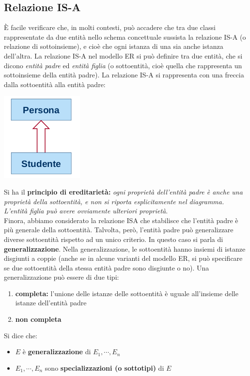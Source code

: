 \documentclass[a4paper,12pt, oneside]{book}
\begin{document}
\subsection{Relazione IS-A}
È facile verificare che, in molti contesti, può
accadere che tra due classi rappresentate da due
entità nello schema concettuale sussista la relazione
IS-A (o relazione di sottoinsieme), e cioè che ogni
istanza di una sia anche istanza dell'altra. La relazione IS-A nel modello ER si può definire tra
due entità, che si dicono \textit{entità padre} ed \textit{entità figlia} (o sottoentità, cioè quella che rappresenta un sottoinsieme della entità padre). La relazione IS-A si rappresenta con una freccia dalla sottoentità alla entità padre:
\begin{center}
\includegraphics[scale=0.8]{img/isa.png}
\end{center}
Si ha il \textbf{principio di ereditarietà:} \textit{ogni proprietà dell'entità padre è
anche una proprietà della sottoentità, e non si riporta
esplicitamente nel diagramma. L'entità figlia può avere
ovviamente ulteriori proprietà}.\\
Finora, abbiamo considerato la relazione ISA che stabilisce
che l'entità padre è più generale della sottoentità. Talvolta, però, l'entità padre può generalizzare diverse sottoentità rispetto ad un unico criterio. In questo caso si parla di \textbf{generalizzazione}. Nella generalizzazione, le sottoentità hanno insiemi di istanze
disgiunti a coppie (anche se in alcune varianti del modello ER, si può specificare se due sottoentità della stessa entità padre sono disgiunte o no). Una generalizzazione può essere di due tipi:
\begin{enumerate}
\item \textbf{completa:} l'unione delle istanze delle sottoentità è uguale all'insieme delle istanze dell'entità padre
\item \textbf{non completa}
\end{enumerate}
Si dice che:
\begin{itemize}
\item $E$ è \textbf{generalizzazione} di $E_1,\cdots, E_n$
\item $E_1,\cdots,E_n$ sono \textbf{specializzazioni (o sottotipi)} di $E$
\end{itemize}
\end{document}
